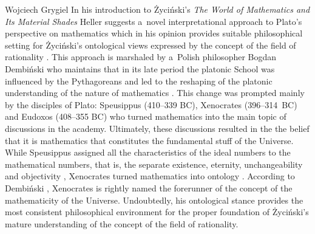 \begin{artengenv}{Wojciech Grygiel}
In his introduction to Życiński's \textit{The World of Mathematics and Its Material Shades} Heller suggests a~novel interpretational approach to Plato's perspective on mathematics which in his opinion provides suitable philosophical setting for Życiński's ontological views expressed by the concept of the field of rationality
\parencite[][pp.5–15]{zycinski_swiat_2013}. %
 This approach is marshaled by a~Polish philosopher Bogdan Dembiński who maintains that in its late period the platonic School was influenced by the Pythagoreans and led to the reshaping of the platonic understanding of the nature of mathematics 
\parencites[][]{dembinski_pozna_2003}[][]{dembinski_pozny_2010}[][]{dembinski_o_2015}[][]{dembinski_u_2017}[][]{dembinski_theory_2019}. %
 This change was prompted mainly by the disciples of Plato: Speusippus (410--339 BC), Xenocrates (396--314~BC) and Eudoxos (408--355 BC) who turned mathematics into the main topic of discussions in the academy. Ultimately, these discussions resulted in the the belief that it is mathematics that constitutes the fundamental stuff of the Universe. While Speusippus assigned all the characteristics of the ideal numbers to the mathematical numbers, that is, the separate existence, eternity, unchangeability and objectivity 
\parencite[][pp.109–138]{dembinski_pozny_2010}, %
 Xenocrates turned mathematics into ontology 
\parencite[][pp.139–170]{dembinski_pozny_2010}. %
 According to Dembiński 
\parencite*[][p.158]{dembinski_pozny_2010}, %
 Xenocrates is rightly named the forerunner of the concept of the mathematicity of the Universe. Undoubtedly, his ontological stance provides the most consistent philosophical environment for the proper foundation of Życiński's mature understanding of the concept of the field of rationality.


\end{artengenv}
